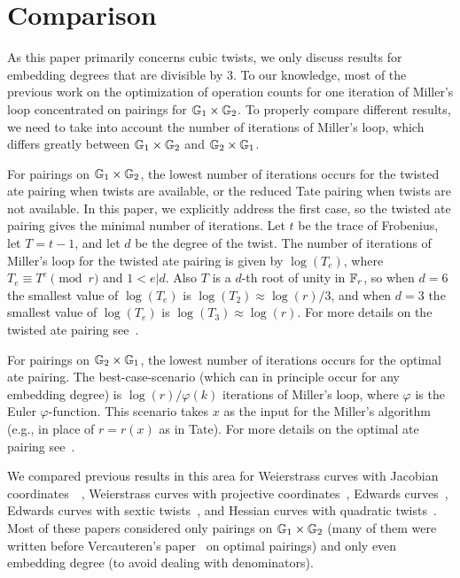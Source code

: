 \section{Comparison}
\label{sec:cmp}

As this paper primarily concerns cubic twists, 
we only discuss results for embedding degrees that are divisible by 3.
To our knowledge, most of the previous work
on the optimization of operation counts for one iteration of Miller's loop
concentrated on pairings for $\mathbb{G}_{1} \times \mathbb{G}_{2}$. 
To properly compare different results, we need to take
into account the number of iterations of Miller's loop, which differs
greatly between $\mathbb{G}_{1} \times \mathbb{G}_{2}$ and $\mathbb{G}_{2} \times \mathbb{G}_{1}$.

For pairings on $\mathbb{G}_{1} \times \mathbb{G}_{2}$, the lowest number of iterations occurs for the twisted ate pairing when twists are available, or the reduced Tate pairing when twists are not available.
In this paper, we explicitly address the first case, so the twisted ate pairing gives the minimal number of iterations. 
Let $t$ be the trace of Frobenius, let $T = t-1$, and let $d$ be the degree of the twist. The number of iterations of Miller's loop for the twisted ate pairing is given by $\log(T_e)$, where
$T_e \equiv T^e \pmod{r}$ and $1 < e | d$. 
Also $T$ is a $d$-th root of unity in $\mathbb{F}_{r}$, so when $d = 6$ the smallest value of
$\log(T_e)$ is $\log(T_2) \approx \log(r)/3$, and when $d = 3$ the smallest value of $\log(T_e)$ is
$\log(T_3) \approx \log(r)$. For more details on the twisted ate pairing see~\cite{2006/hess}.

For pairings on $\mathbb{G}_{2} \times \mathbb{G}_{1}$, the lowest number of iterations occurs for the optimal ate pairing. The best-case-scenario (which can in principle occur for any embedding degree) is $\log(r)/\varphi(k)$ iterations of Miller's loop, where $\varphi$ is the Euler $\varphi$-function. This scenario takes $x$ as the input for the Miller's algorithm (e.g., in place of $r = r(x)$ as in Tate). For more details on the optimal ate pairing see~\cite{2010/vercauteren}. 

We compared previous results in this area for 
Weierstrass curves with Jacobian coordinates~\cite{2008/IonicaJoux08}~\cite{2009/fastertate},
Weierstrass curves with projective coordinates~\cite{2009/craig},
Edwards curves~\cite{2009/fastertate},
Edwards curves with sextic twists~\cite{2014/LWZ},
and Hessian curves with quadratic twists~\cite{2010/Gu}.
Most of these papers considered only pairings on $\mathbb{G}_{1} \times \mathbb{G}_{2}$ 
(many of them were written before Vercauteren's paper~\cite{2010/vercauteren} on optimal pairings)
and only even embedding degree (to avoid dealing with denominators).

